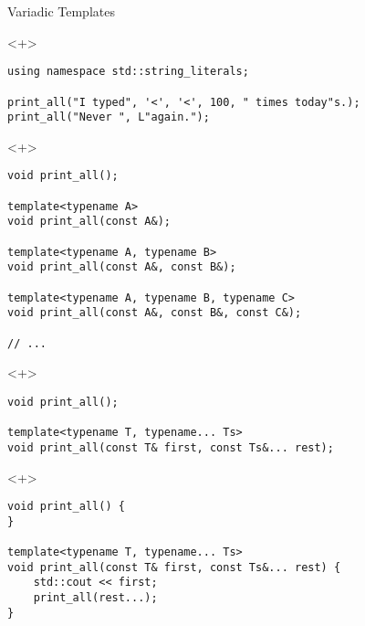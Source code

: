 \documentclass[table]{beamer}
\begin{document}
\begin{frame}[fragile]{Variadic Templates}
  \begin{onlyenv}<+>
    \begin{verbatim}  
using namespace std::string_literals;

print_all("I typed", '<', '<', 100, " times today"s.);
print_all("Never ", L"again.");
    \end{verbatim}
  \end{onlyenv}

  \begin{onlyenv}<+>
    \begin{verbatim}
void print_all();

template<typename A>
void print_all(const A&);

template<typename A, typename B>
void print_all(const A&, const B&);

template<typename A, typename B, typename C>
void print_all(const A&, const B&, const C&);

// ...
    \end{verbatim}
  \end{onlyenv}

  \begin{onlyenv}<+>
\begin{verbatim}
void print_all();

template<typename T, typename... Ts>
void print_all(const T& first, const Ts&... rest);
    \end{verbatim}
  \end{onlyenv}

  \begin{onlyenv}<+>
\begin{verbatim}
void print_all() {
}

template<typename T, typename... Ts>
void print_all(const T& first, const Ts&... rest) {
    std::cout << first;
    print_all(rest...);
}
    \end{verbatim}
  \end{onlyenv}  
\end{frame}
\end{document}
